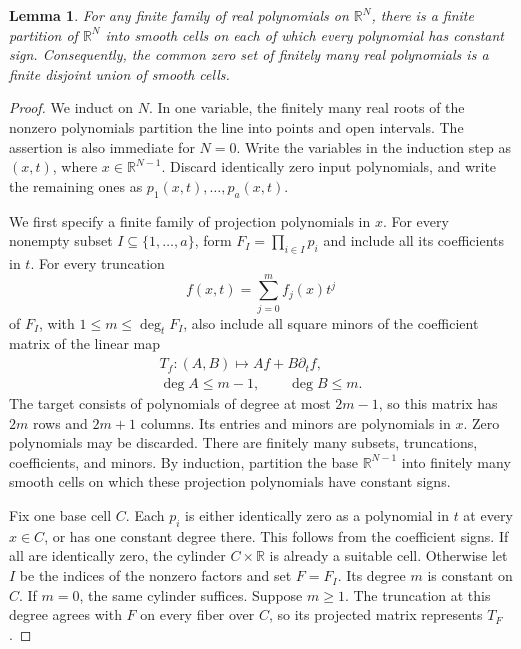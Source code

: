 \documentclass[aps,prl,reprint,notitlepage,nofootinbib,nobibnotes]{revtex4-2}
\newtheorem{lemma}{Lemma}
\begin{document}
\begin{lemma}\label{lem:finite-smooth-decomposition}
For any finite family of real polynomials on \(\mathbb R^N\), there is a
finite partition of \(\mathbb R^N\) into smooth cells on each of which
every polynomial has constant sign. Consequently, the common zero set
of finitely many real polynomials is a finite disjoint union of smooth
cells.
\end{lemma}

\begin{proof}
We induct on \(N\). In one variable, the finitely many real roots of
the nonzero polynomials partition the line into points and open
intervals. The assertion is also immediate for \(N=0\).
Write the variables in the induction step as \((x,t)\), where
\(x\in\mathbb R^{N-1}\). Discard identically zero input polynomials,
and write the remaining ones as \(p_1(x,t),\ldots,p_a(x,t)\).

We first specify a finite family of projection polynomials in \(x\).
For every nonempty subset \(I\subseteq\{1,\ldots,a\}\), form
\(F_I=\prod_{i\in I}p_i\) and include all its coefficients in \(t\).
For every truncation
\[
 f(x,t)=\sum_{j=0}^{m}f_j(x)t^j
\]
of \(F_I\), with \(1\le m\le\deg_t F_I\), also include all square
minors of the coefficient matrix of the linear map
\begin{equation}\label{eq:endmatter-Sylvester}
 \begin{gathered}
 T_f:(A,B)\longmapsto Af+B\partial_t f,\\
 \deg A\le m-1,\qquad\deg B\le m.
 \end{gathered}
\end{equation}
The target consists of polynomials of degree at most \(2m-1\), so this
matrix has \(2m\) rows and \(2m+1\) columns. Its entries and minors are
polynomials in \(x\). Zero polynomials may be discarded. There are
finitely many subsets, truncations, coefficients, and minors.
By induction, partition the base \(\mathbb R^{N-1}\) into finitely many
smooth cells on which these projection polynomials have constant signs.

Fix one base cell \(C\). Each \(p_i\) is either identically zero as a
polynomial in \(t\) at every \(x\in C\), or has one constant degree
there. This follows from the coefficient signs. If all are identically
zero, the cylinder \(C\times\mathbb R\) is already a suitable cell.
Otherwise let \(I\) be the indices of the nonzero factors and set
\(F=F_I\). Its degree \(m\) is constant on \(C\). If \(m=0\), the same
cylinder suffices. Suppose \(m\ge1\). The truncation at this degree
agrees with \(F\) on every fiber over \(C\), so its projected matrix
represents \(T_F\).


\end{proof}
\end{document}
